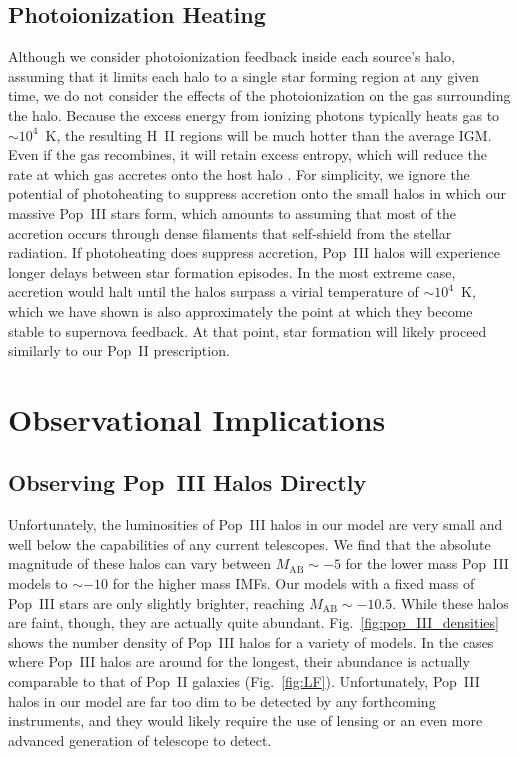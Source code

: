 \documentclass[a4paper,fleqn,usenatbib]{mnras}
\begin{document}
\subsection{Photoionization Heating}
\label{sec:photo}

Although we consider photoionization feedback inside each source's halo, assuming that it limits each halo to a single star forming region at any given time, we do not consider the effects of the photoionization on the gas surrounding the halo. Because the excess energy from ionizing photons typically heats gas to $\sim 10^4$~K, the resulting H~II regions will be much hotter than the average IGM. Even if the gas recombines, it will retain excess entropy, which will reduce the rate at which gas accretes onto the host halo \citep{oh_haiman_2003}. For simplicity, we ignore the potential of photoheating to suppress accretion onto the small halos in which our massive Pop~III stars form, which amounts to assuming that most of the accretion occurs through dense filaments that self-shield from the stellar radiation. If photoheating does suppress accretion, Pop~III halos will experience longer delays between star formation episodes. In the most extreme case, accretion would halt until the halos surpass a virial temperature of $\sim 10^4$~K, which we have shown is also approximately the point at which they become stable to supernova feedback. At that point, star formation will likely proceed similarly to our Pop~II prescription.

\section{Observational Implications}
\label{sec:discussion}

\subsection{Observing Pop~III Halos Directly}

Unfortunately, the luminosities of Pop~III halos in our model are very small and well below the capabilities of any current telescopes. 
We find that the absolute magnitude of these halos can vary between 
$M_\text{AB} \sim -5 $ for the lower mass Pop~III models to $\sim -10$ for the higher mass IMFs. Our models with a fixed mass of Pop~III stars are only slightly brighter, reaching $M_\text{AB} \sim -10.5$. While these halos are faint, though, they are actually quite abundant.
Fig.~\ref{fig:pop_III_densities} shows the number density of Pop~III halos for a variety of models. In the cases where Pop~III halos are around for the longest, their abundance is actually comparable to that of Pop~II 
galaxies (Fig.~\ref{fig:LF}).
Unfortunately, Pop~III halos in our model are far too dim to be detected by 
any forthcoming instruments, and they would likely require the use of lensing or an even more advanced generation of telescope to detect.
\end{document}
